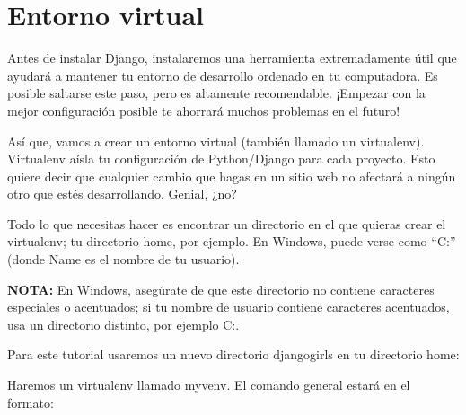 \documentclass[
  a4paper,
  DIV=11,
  numbers=noendperiod,
  onepage,
  openany]{scrreprt}
\newenvironment{Shaded}{\begin{snugshade}}{\end{snugshade}}
\newcommand{\ExtensionTok}[1]{\textcolor[rgb]{0.00,0.23,0.31}{#1}}
\newcommand{\NormalTok}[1]{\textcolor[rgb]{0.00,0.23,0.31}{#1}}
\begin{document}
\chapter{Entorno virtual}\label{entorno-virtual-1}

Antes de instalar Django, instalaremos una herramienta extremadamente
útil que ayudará a mantener tu entorno de desarrollo ordenado en tu
computadora. Es posible saltarse este paso, pero es altamente
recomendable. ¡Empezar con la mejor configuración posible te ahorrará
muchos problemas en el futuro!

Así que, vamos a crear un entorno virtual (también llamado un
virtualenv). Virtualenv aísla tu configuración de Python/Django para
cada proyecto. Esto quiere decir que cualquier cambio que hagas en un
sitio web no afectará a ningún otro que estés desarrollando. Genial,
¿no?

Todo lo que necesitas hacer es encontrar un directorio en el que quieras
crear el virtualenv; tu directorio home, por ejemplo. En Windows, puede
verse como ``C:\Users\Name'' (donde Name es el nombre de tu usuario).

\begin{tcolorbox}[enhanced jigsaw, toptitle=1mm, colbacktitle=quarto-callout-tip-color!10!white, rightrule=.15mm, colframe=quarto-callout-tip-color-frame, left=2mm, colback=white, opacityback=0, breakable, leftrule=.75mm, bottomtitle=1mm, titlerule=0mm, title=\textcolor{quarto-callout-tip-color}{\faLightbulb}\hspace{0.5em}{Tip}, toprule=.15mm, bottomrule=.15mm, coltitle=black, arc=.35mm, opacitybacktitle=0.6]

\textbf{NOTA:} En Windows, asegúrate de que este directorio no contiene
caracteres especiales o acentuados; si tu nombre de usuario contiene
caracteres acentuados, usa un directorio distinto, por ejemplo
C:\djangogirls.

\end{tcolorbox}

Para este tutorial usaremos un nuevo directorio djangogirls en tu
directorio home:

\begin{Shaded}
\end{Shaded}

Haremos un virtualenv llamado myvenv. El comando general estará en el
formato:
\end{document}
